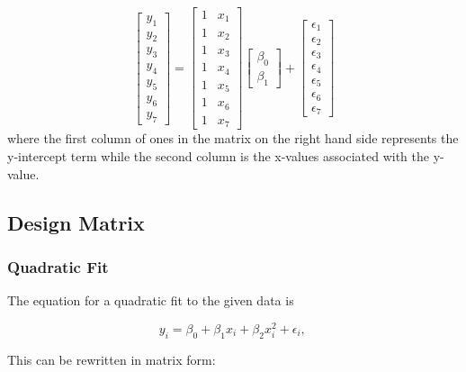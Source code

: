 \begin{equation}\label{eq:simpleRegression}
  \begin{bmatrix}y_1 \\ y_2 \\ y_3 \\ y_4 \\ y_5 \\ y_6 \\ y_7 \end{bmatrix}
  =
  \begin{bmatrix}1 & x_1  \\1 & x_2  \\1 & x_3  \\1 & x_4  \\1 & x_5  \\1 & x_6 \\ 1 & x_7  \end{bmatrix}
  \begin{bmatrix} \beta_0 \\ \beta_1  \end{bmatrix}
  +
  \begin{bmatrix} \epsilon_1 \\ \epsilon_2 \\ \epsilon_3 \\ \epsilon_4 \\ \epsilon_5 \\ \epsilon_6 \\ \epsilon_7 \end{bmatrix}
\end{equation}
where the first column of ones in the matrix on the right hand side represents the y-intercept term while the second column is the x-values associated with the y-value.

\subsection{Design Matrix}

\subsubsection{Quadratic Fit}

The equation for a quadratic fit to the given data is

\begin{equation}
  y_i = \beta_0 + \beta_1 x_i + \beta_2 x_i^2 +\epsilon_i, \,
\end{equation}

This can be rewritten in matrix form:

